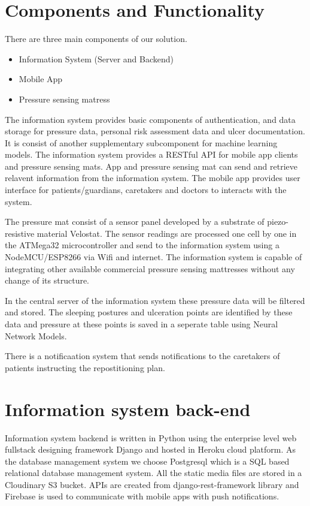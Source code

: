 \section{Components and Functionality}

There are three main components of our solution. 
\begin{itemize}
	\item Information System (Server and Backend)
	\item Mobile App
	\item Pressure sensing matress
\end{itemize}


The information system provides basic components of authentication, and data storage for pressure data, personal risk assessment data and ulcer documentation. It is consist of another supplementary subcomponent for machine learning models. The information system provides a RESTful API for mobile app clients and pressure sensing mats. App and pressure sensing mat can send and retrieve relavent information from the information system. The mobile app provides user interface for patients/guardians, caretakers and doctors to interacts with the system.

The pressure mat consist of a sensor panel developed by a substrate of piezo-resistive material Velostat\textsuperscript{\textregistered}. The sensor readings are processed one cell by one in the ATMega32\textsuperscript{\textregistered} microcontroller and send to the information system using a NodeMCU/ESP8266\textsuperscript{\textregistered} via Wifi and internet. The information system is capable of integrating other available commercial pressure sensing mattresses without any change of its structure.

In the central server of the information system these pressure data will be filtered and stored. The sleeping postures and ulceration points are identified by these data and pressure at these points is saved in a seperate table using Neural Network Models.

There is a notificaation system that sends notifications to the caretakers of patients instructing the repostitioning plan.


\section{Information system back-end}

Information system backend is written in Python using the enterprise level web fullstack designing framework Django\textsuperscript{\textregistered} and hosted in Heroku\textsuperscript{\textregistered} cloud platform. As the database management system we choose Postgresql which is a SQL based relational database management system. All the static media files are stored in a Cloudinary S3 bucket\textsuperscript{\textregistered}. APIs are created from django-rest-framework library and Firebase\textsuperscript{\textregistered} is used to communicate with mobile apps with push notifications. 

